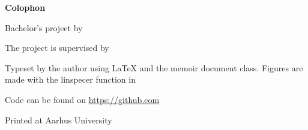 \makeatletter
\edef\fontandleading{\@memptsize.0/\the\baselineskip}
\makeatother
\thispagestyle{empty}
\strut\vfill
{
	\setlength{\parindent}{0pt}
	\addtolength{\parskip}{.6em}
	
	\begin{center}
		\bfseries\sffamily Colophon
	\end{center}
	
	\small
	
	\textsl{\projecttitle}
	
	\smallskip
	
	Bachelor's project by 
	
	The project is supervised by 
	
	Typeset by the author using \LaTeX{} and the \textsf{memoir} document class. Figures are made with the linspecer function in \MATLAB
	
	Code can be found on \url{https://github.com}
	
	Printed at Aarhus University
}

